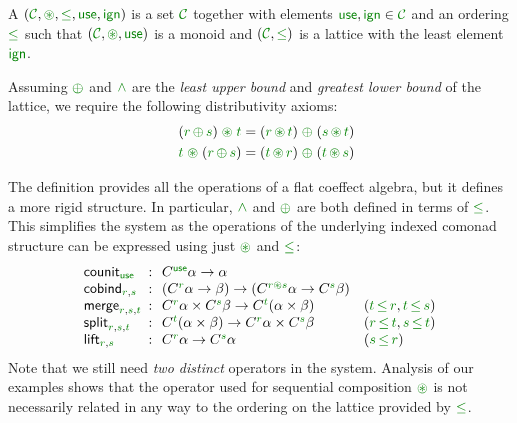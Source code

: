 \begin{definition}
A \emph{} $(\C, \cseq, \cleq, \cunit, \czero)$ is a set
$\C$ together with elements $\cunit, \czero \in \C$ and an ordering $\cleq$ such
that $(\C, \cseq, \cunit)$ is a monoid and $(\C, \cleq)$ is a lattice with the least
element $\czero$.

Assuming $\cpar$ and $\czip$ are the \emph{least upper bound} and \emph{greatest lower bound}
of the lattice, we require the following distributivity axioms:
%
\begin{align*}
\quad (\cclrd{r}\, \cpar\, \cclrd{s}) \;\cseq\; \cclrd{t} & = (\cclrd{r} \,\cseq\, \cclrd{t}) \;\cpar\; (\cclrd{s}\, \cseq\, \cclrd{t}) \\
\quad \cclrd{t} \;\cseq\; (\cclrd{r}\, \cpar\, \cclrd{s}) & = (\cclrd{t} \,\cseq\, \cclrd{r}) \;\cpar\; (\cclrd{t}\, \cseq\, \cclrd{s})
\end{align*}
\end{definition}

\noindent
The definition provides all the operations of a flat coeffect algebra, but it defines a more rigid
structure. In particular, $\czip$ and $\cpar$ are both defined in terms of $\cleq$. This simplifies
the system as the operations of the underlying indexed comonad structure can be expressed using just
$\cseq$ and $\cleq$:
%
\begin{equation*}
\begin{array}{lcll}
 \ident{counit}_{\cunit} &\narrow{:}&
    \ctyp{\cunit}{\alpha} \rightarrow \alpha \\
 \ident{cobind}_{\cclrd{r}, \cclrd{s}} &\narrow{:}&
    (\ctyp{\cclrd{r}}{\alpha} \rightarrow \beta) \rightarrow (\ctyp{\cclrd{r}\cseq\cclrd{s}}{\alpha} \rightarrow \ctyp{\cclrd{s}}{\beta}) \\
\ident{merge}_{\cclrd{r},\cclrd{s},\cclrd{t}} &\narrow{:}&
    \ctyp{\cclrd{r}}{\alpha} \times \ctyp{\cclrd{s}}{\beta} \rightarrow \ctyp{\cclrd{t}}{(\alpha \times \beta)} &
    (\cclrd{t}\,\cleq\,\cclrd{r}, \cclrd{t}\,\cleq\,\cclrd{s}) \\
\ident{split}_{\cclrd{r},\cclrd{s},\cclrd{t}} &\narrow{:}&
    \ctyp{\cclrd{t}}{(\alpha \times \beta)} \rightarrow \ctyp{\cclrd{r}}{\alpha} \times \ctyp{\cclrd{s}}{\beta} &
    (\cclrd{r}\,\cleq\,\cclrd{t}, \cclrd{s}\,\cleq\,\cclrd{t}) \\
\ident{lift}_{\cclrd{r},\cclrd{s}} &\narrow{:}&
    \ctyp{\cclrd{r}}{\alpha} \rightarrow \ctyp{\cclrd{s}}{\alpha} &
    (\cclrd{s}\,\cleq\,\cclrd{r})
\end{array}
\end{equation*}
%
Note that we still need \emph{two distinct} operators in the system. Analysis of our examples shows
that the operator used for sequential composition $\cseq$ is not necessarily related in any way to
the ordering on the lattice provided by $\cleq$.

